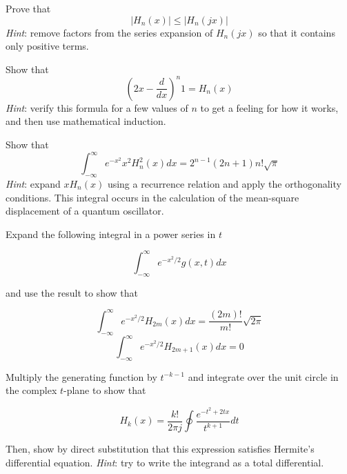 \begin{sidebar}
\begin{ex}
Prove that 
$$ | H_n(x) | \le  | H_n(jx) | $$
\emph{Hint}: remove factors from the series expansion of $ H_n(jx) $ so that it contains only positive terms.
\end{ex}
\end{sidebar}


\begin{sidebar}
\begin{ex}
Show that 
$$\left( 2x - \frac{d}{dx} \right)^n 1 = H_n(x)$$
\emph{Hint}: verify this formula for a few values of $n$ to get a feeling for how it works, and then use mathematical induction.
\end{ex}
\end{sidebar}

\begin{sidebar}
\begin{ex}
Show that
$$ \int_{-\infty}^{\infty} e^{-x^2} x^2 H_n^2(x) dx = 2^{n-1} (2n + 1) n! \sqrt{\pi} $$
\emph{Hint}: expand $x H_n(x)$ using a recurrence relation and apply the orthogonality conditions.
This integral occurs in the calculation of the mean-square displacement of a quantum oscillator.
\end{ex}
\end{sidebar}

\begin{sidebar}
\begin{ex}
Expand the following integral in a power series in $t$

$$ \int_{-\infty}^{\infty} e^{-x^2/2} g(x,t) dx$$

and use the result to show that

$$\int_{-\infty}^{\infty} e^{-x^2/2} H_{2m}(x) dx = \frac{(2m)!}{m!} \sqrt{2\pi} $$
$$\int_{-\infty}^{\infty} e^{-x^2/2} H_{2m+1}(x) dx = 0 $$
\end{ex}
\end{sidebar}


\begin{sidebar}
\begin{ex}
Multiply the generating function by $t^{-k-1}$ and integrate over the unit circle in the complex $t$-plane to show that

$$H_k(x) =\frac{k!}{2 \pi j} \oint \frac{e^{-t^2 +2tx}}{t^{k+1}}dt $$

Then, show by direct substitution that this expression satisfies Hermite's differential equation. \emph{Hint}: try to write the integrand as a total differential.
\end{ex}
\end{sidebar}

